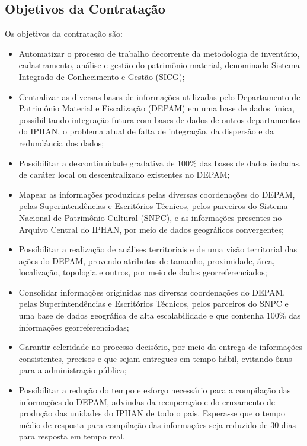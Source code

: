 \subsection[Objetivos da Contratação]{Objetivos da Contratação}

Os objetivos da contratação são:

\begin{itemize}
\item Automatizar o processo de trabalho decorrente da metodologia de inventário, cadastramento, análise e gestão do patrimônio material, denominado Sistema Integrado de Conhecimento e Gestão (SICG);
\item Centralizar as diversas bases de informações utilizadas pelo Departamento de Patrimônio Material e Fiscalização (DEPAM) em uma base de dados única, possibilitando integração futura com bases de dados de outros departamentos do IPHAN,   o problema atual de falta de integração, da dispersão e da redundância dos dados;
\item Possibilitar a descontinuidade gradativa de 100\% das bases de dados isoladas, de caráter local ou descentralizado existentes no DEPAM;
\item Mapear as informações produzidas pelas diversas coordenações do DEPAM, pelas Superintendências e Escritórios Técnicos, pelos parceiros do Sistema Nacional de Patrimônio Cultural (SNPC), e as informações presentes no Arquivo Central do IPHAN, por meio de dados geográficos convergentes;
\item Possibilitar a realização de análises territoriais e de uma visão territorial das ações do DEPAM, provendo atributos de tamanho, proximidade, área, localização, topologia e outros, por meio de dados georreferenciados;
\item Consolidar informações originidas nas diversas coordenações do DEPAM, pelas Superintendências e Escritórios Técnicos, pelos parceiros do SNPC e uma base de dados geográfica de alta escalabilidade e que contenha 100\% das informações georreferenciadas;
\item Garantir celeridade no processo decisório, por meio da entrega de informações consistentes, precisos e que sejam entregues em tempo hábil, evitando ônus para a administração pública;
\item Possibilitar a redução do tempo e esforço necessário para a compilação das informações do DEPAM, advindas da recuperação e do cruzamento de produção das unidades do IPHAN de todo o pais. Espera-se que o tempo médio de resposta para compilação das informações seja reduzido de 30 dias para resposta em tempo real.
\end{itemize}

